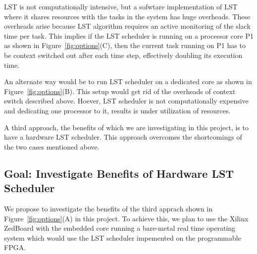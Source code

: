 LST is not computationally intensive, but a sofwtare
implementation of LST where it shares resources with the tasks in the system has
huge overheads. These overheads arise because LST algorithm requires an active
monitoring of the
slack time per task. This implies if the LST
scheduler is running on a processor core P1 as shown in
Figure~\ref{fig:options}(C), then the current task running on P1 has to
be context switched out after each time step, effectively doubling its execution
time.

An alternate way would be to run LST scheduler on a dedicated core as shown in
Figure~\ref{fig:options}(B). This setup would get rid of the overheads of context
switch described above. Hoever, LST scheduler is not computationally expensive
and dedicating one processor to it, results is under utilization of resources.

A third approach, the benefits of which we are investigating in this project, is to have a
hardware LST scheduler. This approach overcomes the shortcomings of the two
cases mentioned above. 

\subsection{Goal: Investigate Benefits of Hardware LST Scheduler}
We propose to investigate the benefits of the third apprach shown in
Figure~\ref{fig:options}(A) in this project. To achieve this, we plan to use
the Xilinx ZedBoard with the embedded core running a bare-metal real time operating system
which would use the LST scheduler impemented on the programmable FPGA.  





